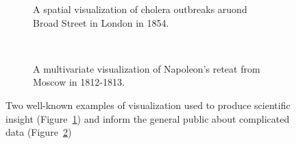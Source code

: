 \begin{figure}
  \centering
  \begin{subfigure}{0.4\textwidth}
    \caption{A spatial visualization of cholera outbreaks aruond Broad Street in London in 1854.}
    \label{fig:motivation:example:cholera}
  \end{subfigure}
  ~
  \begin{subfigure}{0.4\textwidth}
    \caption{A multivariate visualization of Napoleon's reteat from Moscow in 1812-1813.}
    \label{fig:motivation:example:napoleon}
  \end{subfigure}
  \caption{Two well-known examples of visualization used to produce scientific insight (Figure~\ref{fig:motivation:example:cholera}) and inform the general public about complicated data (Figure~\ref{fig:motivation:example:napoleon})}
  \label{fig:motivation:example}
\end{figure}


